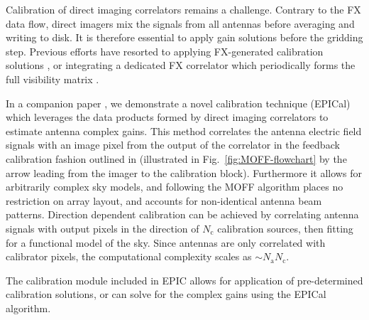 \documentclass[a4paper,fleqn,usenatbib]{mnras}
\begin{document}

\par\medskip
{}
\par\medskip
\noindent Calibration of direct imaging correlators remains a challenge. Contrary
to the FX data flow, direct imagers mix the signals from all antennas before
averaging and writing to disk. It is therefore essential to apply gain solutions 
before the gridding step. Previous efforts have resorted to applying FX-generated
calibration solutions \citep{zhe14,fos14}, or integrating a dedicated FX 
correlator which periodically forms the full visibility matrix 
\citep{wij09,dev09}. 

In a companion paper \citep{bea16}, we demonstrate a novel calibration 
technique (EPICal) which leverages the data products formed by direct imaging 
correlators to estimate antenna complex gains. This method correlates the antenna 
electric field signals with an image pixel from the output of the correlator in 
the feedback calibration fashion outlined in \citealt{mor11} (illustrated in 
Fig.~\ref{fig:MOFF-flowchart} by the arrow leading from the imager to the 
calibration block). Furthermore it allows for arbitrarily complex sky models, 
and following the MOFF algorithm places no restriction on array layout, and 
accounts for non-identical antenna beam patterns. Direction dependent calibration 
can be achieved by correlating antenna signals with output pixels in the 
direction of $N_\textrm{c}$ calibration sources, then fitting for a functional 
model of the sky. Since antennas are only correlated with calibrator pixels, the 
computational complexity scales as $\sim N_\textrm{a} N_\textrm{c}$. 

The calibration module included in EPIC allows for application of pre-determined 
calibration solutions, or can solve for the complex gains using the EPICal 
algorithm.
\end{document}
